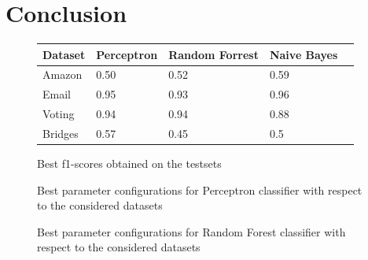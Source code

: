 \documentclass[11pt]{article}
\begin{document}
\section{Conclusion}
%
\begin{figure}
\center
  \begin{tabular}{ | l | l | l | l | l |}
    \hline
    Dataset & Perceptron & Random Forrest  & Naive Bayes \\ \hline
    Amazon  & 0.50			   		 		 & 0.52\cellcolor{gray!25}   	 	   & 0.59\cellcolor{gray!50} \\ \hline
	Email   & 0.95\cellcolor{gray!25}  	 	 & 0.93   		   					   & 0.96\cellcolor{gray!50} \\ \hline
	Voting  & 0.94\cellcolor{gray!50}  	 	 & 0.94\cellcolor{gray!50}   		   & 0.88 	     		     \\ \hline
	Bridges & 0.57\cellcolor{gray!25}  	 	 & 0.45   		   					   & 0.5\cellcolor{gray!50}  \\ \hline
  \end{tabular}
  \caption{Best f1-scores obtained on the testsets}
  \label{tab_conc0}
\end{figure}

\begin{figure}[h]
\centering
{}
    \caption{Best parameter configurations for Perceptron classifier with respect to the considered datasets}
    \label{tab_conc1}
  \end{figure}
  
  \begin{figure}[h]
\centering
{}
    \caption{Best parameter configurations for Random Forest classifier with respect to the considered datasets}
    \label{tab_conc1}
  \end{figure}
  
\end{document}
